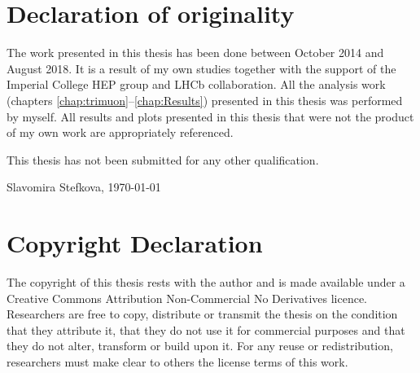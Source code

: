 \chapter*{Declaration of originality}
The work presented in this thesis has been done between October 2014 and August 2018. It is a result of my own studies together with the support of the Imperial College HEP group and LHCb collaboration. All the analysis work (chapters \ref{chap:trimuon}--\ref{chap:Results}) presented in this thesis was performed by myself. All results and plots presented in this thesis that were not the product of my own work are appropriately referenced. %

\vspace{1cm}
This thesis has not been submitted for any other qualification.

\vspace{1cm}



Slavomira Stefkova, \vspace{1cm} \today


\vspace{5cm}

\clearpage
{}
{}
\chapter*{Copyright Declaration}
The copyright of this thesis rests with the author and is made available under a Creative Commons Attribution Non-Commercial No Derivatives licence. Researchers are free to copy, distribute or transmit the thesis on the condition that they attribute it, that they do not use it for commercial purposes and that they do not alter, transform or build upon it. For any reuse or redistribution, researchers must make clear to others the license terms of this work.
